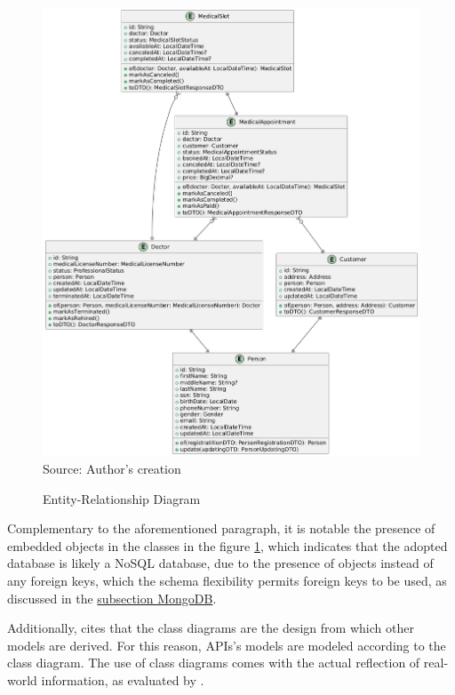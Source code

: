 \begin{figure}[H]
    \caption{Entity-Relationship Diagram}
    \centering
    \includegraphics[width=1\linewidth]{figures/api/erd.png}
    \label{fig:erd}
    \\ \footnotesize Source: Author's creation
\end{figure}

Complementary to the aforementioned paragraph, it is notable the presence of embedded objects in the classes in the figure \ref{fig:erd}, which indicates that the adopted database is likely a NoSQL database, due to the presence of objects instead of any foreign keys, which the schema flexibility permits foreign keys to be used, as discussed in the \hyperref[subsection:database]{subsection MongoDB}.

Additionally, \cite{nanthaamornphong2019extended} cites that the class diagrams are the design from which other models are derived. For this reason, APIs's models are modeled according to the class diagram. The use of class diagrams comes with the actual reflection of real-world information, as evaluated by \cite{vo2020transformation}. 

